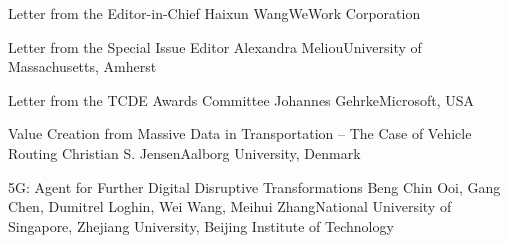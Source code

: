 \documentclass[11pt]{article}
\begin{document}


\begin{bulletin}


%
%

\begin{lettersection}


\begin{letter}{Letter from the Editor-in-Chief}
{Haixun Wang}{WeWork Corporation}

\end{letter}
%
\newpage
%

\begin{letter}{Letter from the Special Issue Editor}
{Alexandra Meliou}{University of Massachusetts, Amherst}

\end{letter}
\newpage
\begin{letter}{Letter from the TCDE Awards Committee}
{Johannes Gehrke}{Microsoft, USA}

\end{letter}

\end{lettersection}




\begin{opinionsection}
\begin{opinion}{Value Creation from Massive Data in Transportation -- The Case of Vehicle Routing}
{Christian S. Jensen}{Aalborg University, Denmark}

\end{opinion}
\begin{opinion}{5G: Agent for Further Digital Disruptive Transformations}
{Beng Chin Ooi, Gang Chen, Dumitrel Loghin, Wei Wang, Meihui Zhang}{National University of Singapore, Zhejiang University, Beijing Institute of Technology}

\end{opinion}
\end{opinionsection}





\end{bulletin}
\end{document}
